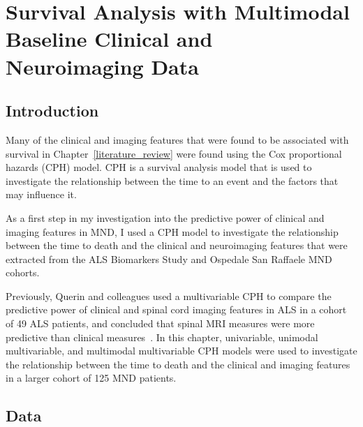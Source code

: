 \chapter{Survival Analysis with Multimodal Baseline Clinical and Neuroimaging Data}
\label{cox_proportional_hazards_model}

\section{Introduction}

Many of the clinical and imaging features that were found to be associated with survival in Chapter~\ref{literature_review} were found using the Cox proportional hazards (CPH) model.
CPH is a survival analysis model that is used to investigate the relationship between the time to an event and the factors that may influence it.

As a first step in my investigation into the predictive power of clinical and imaging features in MND, I used a CPH model to investigate the relationship between the time to death and the clinical and neuroimaging features that were extracted from the ALS Biomarkers Study and Ospedale San Raffaele MND cohorts.

Previously, Querin and colleagues used a multivariable CPH to compare the predictive power of clinical and spinal cord imaging features in ALS in a cohort of 49 ALS patients, and concluded that spinal MRI measures were more predictive than clinical measures~\cite{querinSpinalCordMultiparametric2017}.
In this chapter, univariable, unimodal multivariable, and multimodal multivariable CPH models were used to investigate the relationship between the time to death and the clinical and imaging features in a larger cohort of 125 MND patients.


\section{Data}

